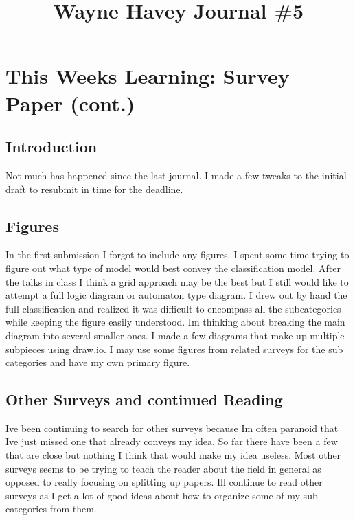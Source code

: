 \documentclass[conference]{IEEEtran}
\begin{document}
\title{Wayne Havey Journal \#5\\
}

\author{
}

\maketitle

\section{This Weeks Learning: Survey Paper (cont.)}
\subsection{Introduction}
Not much has happened since the last journal. I made a few tweaks to the initial draft to resubmit in time for the deadline. 
\subsection{Figures}
In the first submission I forgot to include any figures. I spent some time trying to figure out what type of model would best convey the classification model. After the talks in class I think a grid approach may be the best but I still would like to attempt a full logic diagram or automaton type diagram. I drew out by hand the full classification and realized it was difficult to encompass all the subcategories while keeping the figure easily understood. Im thinking about breaking the main diagram into several smaller ones. I made a few diagrams that make up multiple subpieces using draw.io. I may use some figures from related surveys for the sub categories and have my own primary figure. 
\subsection{Other Surveys and continued Reading}
Ive been continuing to search for other surveys because Im often paranoid that Ive just missed one that already conveys my idea. So far there have been a few that are close but nothing I think that would make my idea useless. Most other surveys seems to be trying to teach the reader about the field in general as opposed to really focusing on splitting up papers. Ill continue to read other surveys as I get a lot of good ideas about how to organize some of my sub categories from them.
\end{document}
